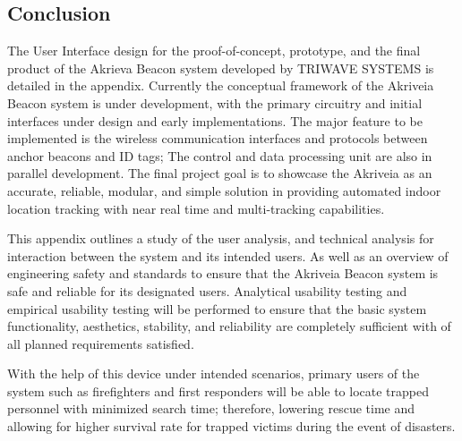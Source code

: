 

\subsection{Conclusion}

\bigskip
The User Interface design for the proof-of-concept, prototype, and the final product of the Akrieva Beacon system developed by TRIWAVE SYSTEMS is detailed in the appendix. Currently the conceptual framework of the Akriveia Beacon system is under development, with the primary circuitry and initial interfaces under design and early implementations. The major feature to be implemented is the wireless communication interfaces and protocols between anchor beacons and ID tags; The control and data processing unit are also in parallel development. The final project goal is to showcase the Akriveia as an accurate, reliable, modular, and simple solution in providing automated indoor location tracking with near real time and multi-tracking capabilities.  

\bigskip
This appendix outlines a study of the user analysis, and technical analysis for interaction between the system and its intended users. As well as an overview of engineering safety and standards to ensure that the Akriveia Beacon system is safe and reliable for its designated users. Analytical usability testing and empirical usability testing will be performed to ensure that the basic system functionality, aesthetics, stability, and reliability are completely sufficient with of all planned requirements satisfied. 

\bigskip
With the help of this device under intended scenarios, primary users of the system such as firefighters and first responders will be able to locate trapped personnel with minimized search time; therefore, lowering rescue time and allowing for higher survival rate for trapped victims during the event of disasters.













